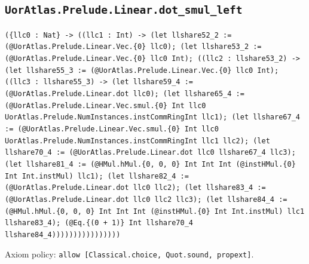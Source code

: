 \documentclass[11pt]{article}
\begin{document}
\subsection*{\texttt{UorAtlas.Prelude.Linear.dot\_smul\_left}}
\noindent\texttt{(\{llc0 : Nat\} -> ((llc1 : Int) -> (let llshare52\_2 := (@UorAtlas.Prelude.Linear.Vec.\{0\} llc0); (let llshare53\_2 := (@UorAtlas.Prelude.Linear.Vec.\{0\} llc0 Int); ((llc2 : llshare53\_2) -> (let llshare55\_3 := (@UorAtlas.Prelude.Linear.Vec.\{0\} llc0 Int); ((llc3 : llshare55\_3) -> (let llshare59\_4 := (@UorAtlas.Prelude.Linear.dot llc0); (let llshare65\_4 := (@UorAtlas.Prelude.Linear.Vec.smul.\{0\} Int llc0 UorAtlas.Prelude.NumInstances.instCommRingInt llc1); (let llshare67\_4 := (@UorAtlas.Prelude.Linear.Vec.smul.\{0\} Int llc0 UorAtlas.Prelude.NumInstances.instCommRingInt llc1 llc2); (let llshare70\_4 := (@UorAtlas.Prelude.Linear.dot llc0 llshare67\_4 llc3); (let llshare81\_4 := (@HMul.hMul.\{0, 0, 0\} Int Int Int (@instHMul.\{0\} Int Int.instMul) llc1); (let llshare82\_4 := (@UorAtlas.Prelude.Linear.dot llc0 llc2); (let llshare83\_4 := (@UorAtlas.Prelude.Linear.dot llc0 llc2 llc3); (let llshare84\_4 := (@HMul.hMul.\{0, 0, 0\} Int Int Int (@instHMul.\{0\} Int Int.instMul) llc1 llshare83\_4); (@Eq.\{(0 + 1)\} Int llshare70\_4 llshare84\_4))))))))))))))))}\par
\noindent Axiom policy: \texttt{allow [Classical.choice, Quot.sound, propext]}.\par
\end{document}

